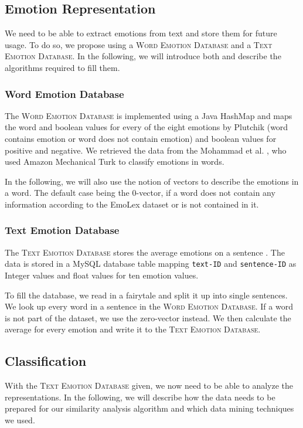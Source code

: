 \documentclass[letterpaper]{article}
\begin{document}
\subsection{Emotion Representation}
We need to be able to extract emotions from text and store them for future usage. To do so, we propose using a \textsc{Word Emotion Database} and a \textsc{Text Emotion Database}. In the following, we will introduce both and describe the algorithms required to fill them. 
\subsubsection{Word Emotion Database}
The \textsc{Word Emotion Database} is implemented using a Java HashMap and maps the word and boolean values for every of the eight emotions by Plutchik \cite{plutchik1980emotion} (word contains emotion or word does not contain emotion) and boolean values for positive and negative. We retrieved the data from the Mohammad et al. \cite{Mohammad}, who used Amazon Mechanical Turk to classify emotions in words. 

In the following, we will also use the notion of vectors to describe the emotions in a word. The default case being the 0-vector, if a word does not contain any information according to the EmoLex dataset or is not contained in it. 

\subsubsection{Text Emotion Database}
The \textsc{Text Emotion Database} stores the average emotions on a sentence                               . The data is stored in a MySQL database table mapping \texttt{text-ID} and \texttt{sentence-ID} as Integer values and float values for ten emotion values. 

To fill the database, we read in a fairytale and split it up into single sentences. We look up every word in a sentence in the \textsc{Word Emotion Database}. If a word is not part of the dataset, we use the zero-vector instead. We then calculate the average for every emotion and write it to the \textsc{Text Emotion Database}. 
\subsection{Classification}
With the \textsc{Text Emotion Database} given, we now need to be able to analyze the representations. In the following, we will describe how the data needs to be prepared for our similarity analysis algorithm and which data mining techniques we used. 
\end{document}

